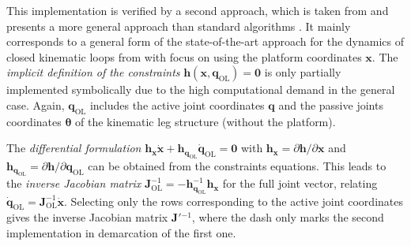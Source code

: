 \documentclass[runningheads]{llncs}
\begin{document}

\begin{property}\label{prop:par_dothanh}
This implementation is verified by a second approach, which is taken from \cite{DoThanhKotHeiOrt2009b} and presents a more general approach than standard algorithms \cite{Merlet2006}.
It mainly corresponds to a general form of the state-of-the-art approach for the dynamics of closed kinematic loops from \cite{Docquier2013} with focus on using the platform coordinates $\bm{x}$.
The \emph{implicit definition of the constraints} $\bm{h}(\bm{x},\bm{q}_{\mathrm{OL}}){=}\bm{0}$ is only partially implemented symbolically due to the high computational demand in the general case.
Again, $\bm{q}_{\mathrm{OL}}$ includes the active joint coordinates $\bm{q}$ and the passive joints coordinates $\bm{\theta}$ of the kinematic leg structure (without the platform).
\end{property}


\begin{property}\label{prop:par_constrD}
The \emph{differential formulation}
%
$\bm{h}_{\bm{x}} \dot{\bm{x}} {+} \bm{h}_{\bm{q}_{\mathrm{OL}}} \dot{\bm{q}}_{\mathrm{OL}}{=}\bm{0}$
%
with $\bm{h}_{\bm{x}}{=}\partial \bm{h} / \partial \bm{x}$ and $\bm{h}_{\bm{q}_{\mathrm{OL}}}{=}\partial \bm{h} / \partial \bm{q}_{\mathrm{OL}}$
%
can be obtained from the constraints equations.
%
This leads to the \emph{inverse Jacobian matrix} $\bm{J}^{-1}_{\mathrm{OL}}{=}{-}\bm{h}_{\bm{q}_{\mathrm{OL}}}^{-1} \bm{h}_{\bm{x}}$ for the full joint vector, relating $\dot{\bm{q}}_{\mathrm{OL}}{=}\bm{J}^{-1}_{\mathrm{OL}}\dot{\bm{x}}$.
Selecting only the rows corresponding to the active joint coordinates gives the inverse Jacobian matrix $\bm{J}'{}^{-1}$, where the dash only marks the second implementation in demarcation of the first one.
\end{property}
\end{document}
